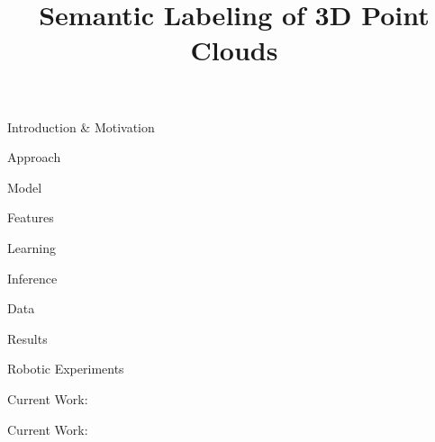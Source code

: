\documentclass{beamer}
\title{Semantic Labeling of 3D Point Clouds}
\begin{document}
\begin{frame}
\titlepage
\end{frame}

\begin{frame}{Introduction \& Motivation}
\end{frame}



\begin{frame}{Approach}
\end{frame}


\begin{frame}{Model}

\end{frame}

\begin{frame}{Features}

\end{frame}

\begin{frame}{Learning}

\end{frame}

\begin{frame}{Inference}
 
 
\end{frame}

\begin{frame}{Data}

\end{frame}


\begin{frame}{Results }
\end{frame}

\begin{frame}{Robotic Experiments}
\end{frame}

\begin{frame}{Current Work: }
\end{frame}

\begin{frame}{Current Work: }
\end{frame}
\end{document}
